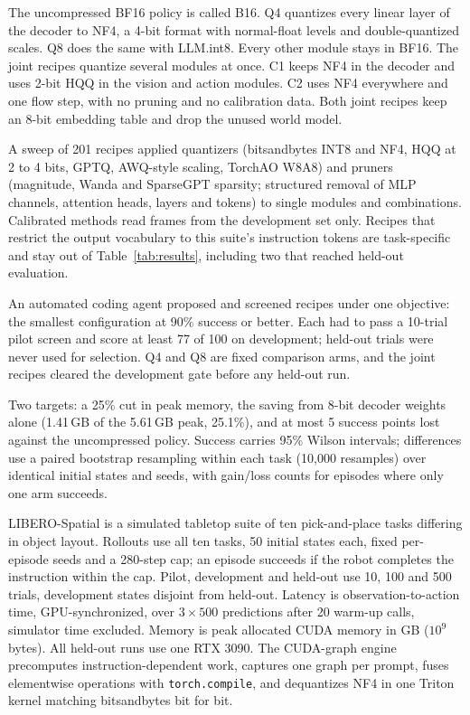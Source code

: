 \documentclass[conference]{IEEEtran}
\begin{document}
The uncompressed BF16 policy is called B16. Q4 quantizes every linear layer of the decoder to NF4, a 4-bit format with normal-float levels and double-quantized scales. Q8 does the same with LLM.int8. Every other module stays in BF16. The joint recipes quantize several modules at once. C1 keeps NF4 in the decoder and uses 2-bit HQQ in the vision and action modules. C2 uses NF4 everywhere and one flow step, with no pruning and no calibration data. Both joint recipes keep an 8-bit embedding table and drop the unused world model.

A sweep of 201 recipes applied quantizers (bitsandbytes INT8 and NF4, HQQ at 2 to 4 bits, GPTQ, AWQ-style scaling, TorchAO W8A8) and pruners (magnitude, Wanda and SparseGPT sparsity; structured removal of MLP channels, attention heads, layers and tokens) to single modules and combinations. Calibrated methods read frames from the development set only. Recipes that restrict the output vocabulary to this suite's instruction tokens are task-specific and stay out of Table~\ref{tab:results}, including two that reached held-out evaluation.

An automated coding agent proposed and screened recipes under one objective: the smallest configuration at 90\% success or better. Each had to pass a 10-trial pilot screen and score at least 77 of 100 on development; held-out trials were never used for selection. Q4 and Q8 are fixed comparison arms, and the joint recipes cleared the development gate before any held-out run.

Two targets: a 25\% cut in peak memory, the saving from 8-bit decoder weights alone (1.41\,GB of the 5.61\,GB peak, 25.1\%), and at most 5 success points lost against the uncompressed policy. Success carries 95\% Wilson intervals; differences use a paired bootstrap resampling within each task (10,000 resamples) over identical initial states and seeds, with gain/loss counts for episodes where only one arm succeeds.

LIBERO-Spatial is a simulated tabletop suite of ten pick-and-place tasks differing in object layout. Rollouts use all ten tasks, 50 initial states each, fixed per-episode seeds and a 280-step cap; an episode succeeds if the robot completes the instruction within the cap. Pilot, development and held-out use 10, 100 and 500 trials, development states disjoint from held-out. Latency is observation-to-action time, GPU-synchronized, over $3\times500$ predictions after 20 warm-up calls, simulator time excluded. Memory is peak allocated CUDA memory in GB ($10^9$ bytes). All held-out runs use one RTX 3090. The CUDA-graph engine precomputes instruction-dependent work, captures one graph per prompt, fuses elementwise operations with \texttt{torch.compile}, and dequantizes NF4 in one Triton kernel matching bitsandbytes bit for bit.
\end{document}
